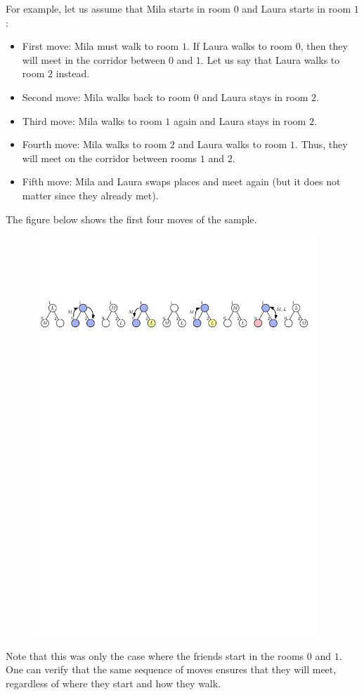 For example, let us assume that Mila starts in room $0$ and Laura starts in room $1$:

\begin{itemize}
\item First move: Mila must walk to room $1$. If Laura walks to room $0$, then they will
  meet in the corridor between $0$ and $1$. Let us say that Laura walks to room $2$ instead.
\item Second move: Mila walks back to room $0$ and Laura stays in room $2$.
\item Third move: Mila walks to room $1$ again and Laura stays in room $2$.
\item Fourth move: Mila walks to room $2$ and Laura walks to room $1$. Thus,
  they will meet on the corridor between rooms $1$ and $2$.
\item Fifth move: Mila and Laura swaps places and meet again
  (but it does not matter since they already met).
\end{itemize}

The figure below shows the first four moves of the sample.
\begin{figure}
\centering
\includegraphics[width=0.95\textwidth]{sample}
\end{figure}

Note that this was only the case where the friends start in the rooms $0$ and $1$.
One can verify that the same sequence of moves ensures that they will meet, regardless of where they start and how they walk.


